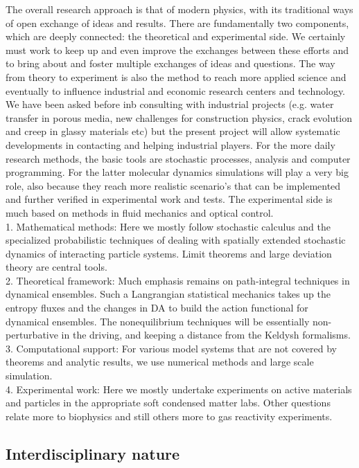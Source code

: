 The overall research approach is that of modern physics, with its traditional ways of open exchange of ideas and results.  There are fundamentally two components, which are deeply connected: the theoretical and experimental side.
We certainly must work to keep up and even improve the exchanges between these efforts and to bring about and foster multiple exchanges of ideas and questions.  The way from theory to experiment is also the method to reach more applied science and eventually to influence industrial and economic research centers and technology.  We have been asked before inb consulting with industrial projects (e.g. water transfer in porous media, new challenges for construction physics, crack evolution and creep in glassy materials etc) but the present project will allow systematic developments in contacting and helping industrial players.
For the more daily research methods, the basic tools are stochastic processes, analysis and computer programming.  For the latter molecular dynamics simulations will play a very big role, also because they reach more realistic scenario's that can be implemented and further verified in experimental work and tests.  The experimental side is much based on methods in fluid mechanics and optical control.\\

1. Mathematical methods: Here we mostly follow stochastic calculus and the specialized probabilistic techniques of dealing with spatially extended stochastic dynamics of interacting particle systems. Limit theorems and large deviation theory are central tools.\\
2. Theoretical framework:  Much emphasis remains on path-integral techniques in dynamical ensembles.  Such a Langrangian statistical mechanics takes up the entropy fluxes and the changes in DA to build the action functional for dynamical ensembles.  The nonequilibrium techniques will be essentially non-perturbative in the driving, and keeping a distance from the Keldysh formalisms.\\
3. Computational support: For various model systems that are not covered by theorems and analytic results, we use numerical methods and large scale simulation.\\
4. Experimental work: Here we mostly undertake experiments on active materials and particles in the appropriate soft condensed matter labs.  Other questions relate more to biophysics and still others more to gas reactivity experiments.

\subsection{Interdisciplinary nature}\label{sec:interdisc}

